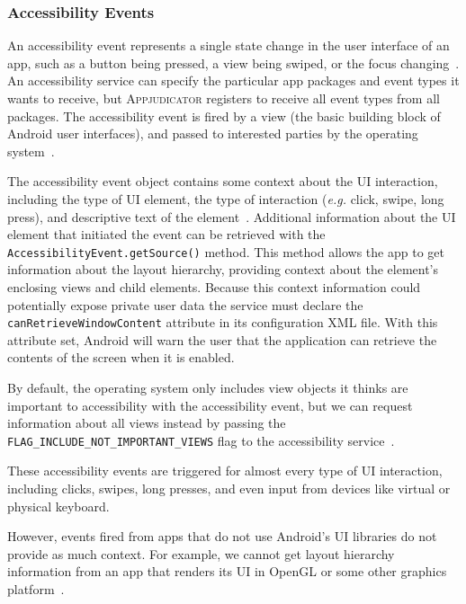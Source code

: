 \subsubsection{Accessibility Events}
\label{sec:accessibility-events}

An accessibility event represents a single state change in the user interface of
an app, such as a button being pressed, a view being swiped, or the focus
changing~\cite{accessibilityserviceguide}. An accessibility service can specify
the particular app packages and event types it wants to receive, but
\textsc{Appjudicator} registers to receive all event types from all packages.
The accessibility event is fired by a view (the basic building block of Android
user interfaces), and passed to interested parties by the operating
system~\cite{googledevelopersevent}.

The accessibility event object contains some context about the UI interaction,
including the type of UI element, the type of interaction (\textit{e.g.} click,
swipe, long press), and descriptive text of the
element~\cite{accessibilityserviceguide}. Additional information about the UI
element that initiated the event can be retrieved with the
\texttt{AccessibilityEvent.getSource()} method. This method allows the app to
get information about the layout hierarchy, providing context about the
element's enclosing views and child elements. Because this context information
could potentially expose private user data the service must declare the
\texttt{canRetrieveWindowContent} attribute in its configuration XML file. With
this attribute set, Android will warn the user that the application can retrieve
the contents of the screen when it is enabled.

By default, the operating system only includes view objects it thinks are
important to accessibility with the accessibility event, but we can request
information about all views instead by passing the 
\texttt{FLAG\_INCLUDE\_NOT\_IMPORTANT\_VIEWS} flag to the accessibility
service~\cite{accessibilityserviceguide}.

These accessibility events are triggered for almost every type of UI interaction,
including clicks, swipes, long presses, and even input from devices like virtual
or physical keyboard.

However, events fired from apps that do not use Android's
UI libraries do not provide as much context. For example, we cannot get layout
hierarchy information from an app that renders its UI in OpenGL or some other
graphics platform~\cite{accessibilityserviceguide}. 

